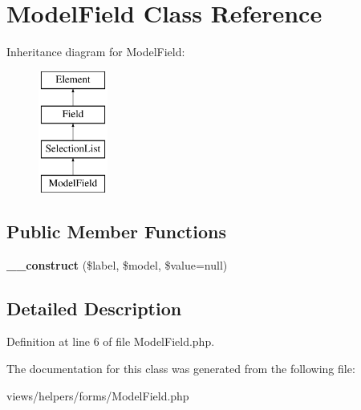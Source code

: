 \hypertarget{class_model_field}{
\section{ModelField Class Reference}
\label{class_model_field}
}
Inheritance diagram for ModelField:\begin{figure}[H]
\begin{center}
\leavevmode
\includegraphics[height=4.000000cm]{class_model_field}
\end{center}
\end{figure}
\subsection*{Public Member Functions}
\begin{DoxyCompactItemize}
\item 
\hypertarget{class_model_field_af361e6b8692397f10b58c37bc4f9804a}{
{\bfseries \_\-\_\-construct} (\$label, \$model, \$value=null)}
\label{class_model_field_af361e6b8692397f10b58c37bc4f9804a}

\end{DoxyCompactItemize}


\subsection{Detailed Description}


Definition at line 6 of file ModelField.php.



The documentation for this class was generated from the following file:\begin{DoxyCompactItemize}
\item 
views/helpers/forms/ModelField.php\end{DoxyCompactItemize}
